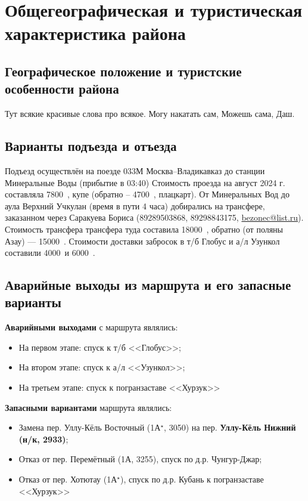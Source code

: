 \section{Общегеографическая и туристическая характеристика района}

\subsection{Географическое положение и туристские особенности района}
Тут всякие красивые слова про всякое. Могу накатать сам, Можешь  сама, Даш. 


\subsection{Варианты подъезда и отъезда}
Подъезд осуществлён на поезде 033М Москва--Владикавказ до станции Минеральные Воды (прибытие в 03:40) Стоимость проезда на август 2024 г. составляла 7800~\faRub, купе (обратно – 4700~\faRub, плацкарт). От Минеральных Вод до аула Верхний Учкулан (время в пути 4 часа) добирались на трансфере, заказанном через Саракуева Бориса (89289503868, 89298843175,  \href{mailto: bezonec@list.ru}{bezonec@list.ru}). Стоимость трансфера трансфера туда составила 18000~\faRub, обратно (от поляны Азау) — 15000~\faRub. Стоимости доставки забросок в т/б Глобус и а/л Узункол составили 4000~\faRub  и 6000~\faRub.

\subsection{Аварийные выходы из маршрута и его запасные варианты}
\textbf{Аварийными выходами} с маршрута являлись:
\begin{itemize}
	\item На первом этапе: спуск к т/б <<Глобус>>;
	\item На втором этапе: спуск к а/л <<Узункол>>;
	\item На третьем этапе: спуск к погранзаставе <<Хурзук>>
\end{itemize}


\textbf{Запасными вариантами} маршрута являлись:
\begin{itemize}
	\item Замена пер. Уллу-Кёль Восточный (1А$^\star$, 3050) на пер. \textbf{Уллу-Кёль Нижний (н/к, 2933)};
	\item Отказ от пер. Перемётный (1А, 3255), спуск по д.р. Чунгур-Джар;
	\item Отказ от пер. Хотютау (1А$^\star$), спуск по д.р. Кубань к погранзаставе <<Хурзук>>
\end{itemize}


